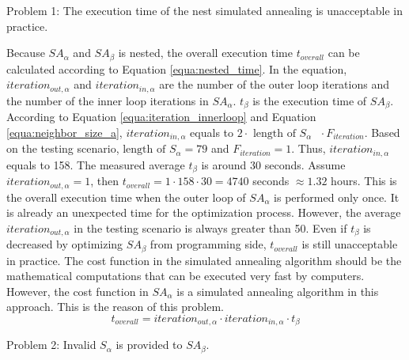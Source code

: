 		Problem 1: The execution time of the nest simulated annealing is unacceptable in
		practice.
		
		Because $SA_{\alpha}$ and $SA_{\beta}$ is nested, the overall execution time
		$t_{overall}$ can be calculated according to Equation \ref{equa:nested_time}.
		In the equation, $iteration_{out,\alpha}$ and $iteration_{in,\alpha}$ are the
		number of the outer loop iterations and the number of the inner loop iterations in $SA_{\alpha}$.
		$t_{\beta}$ is the execution time of $SA_{\beta}$.
		According to Equation \ref{equa:iteration_innerloop} and Equation
		\ref{equa:neighbor_size_a},
		$iteration_{in,\alpha} $ equals to $2 \cdot \text{ length of $S_{\alpha}$ } \cdot F_{iteration}$.
		Based on the testing scenario, $\text{length of $S_{\alpha}$}=79$ and $F_{iteration}=1$.
		Thus, $iteration_{in,\alpha}$ equals to 158.
		The measured average $t_{\beta}$ is around 30 seconds.
		Assume $iteration_{out,\alpha}=1$, then
		$t_{overall}=1 \cdot 158 \cdot 30=4740$ seconds $\approx 1.32$ hours.
		This is the overall execution time when the outer loop of $SA_{\alpha}$ is
		performed only once. It is already an unexpected time for the optimization
		process.
		However, the average $iteration_{out,\alpha}$ in the testing scenario is always
		greater than 50.
		Even if $t_{\beta}$ is decreased by optimizing $SA_{\beta}$ from programming
		side, $t_{overall}$ is still unacceptable in practice.
		The cost function in the simulated annealing algorithm should be the mathematical
		computations that can be executed very fast by computers.
		However, the cost function in $SA_{\alpha}$ is a simulated annealing algorithm
		in this approach. This is the reason of this problem.
		\begin{equation}
		\label{equa:nested_time}
			t_{overall}=iteration_{out,\alpha} \cdot iteration_{in,\alpha} \cdot t_{\beta}
		\end{equation}
		
		Problem 2: Invalid $S_{\alpha}$ is provided to $SA_{\beta}$.
		
